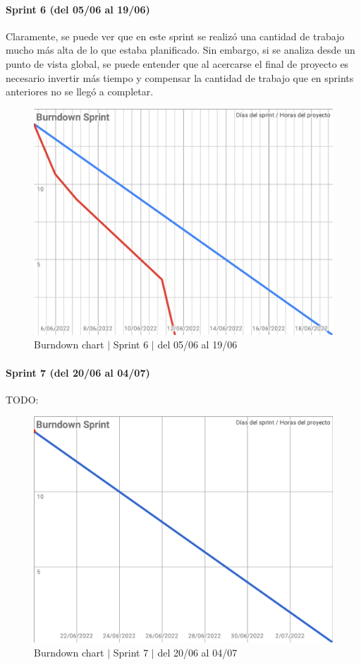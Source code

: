 \paragraph{Sprint 6 (del 05/06 al 19/06)}
Claramente, se puede ver que en este sprint se realizó una cantidad de trabajo mucho más alta de lo que estaba planificado. Sin embargo, si se analiza desde un punto de vista global, se puede entender que al acercarse el final de proyecto es necesario invertir más tiempo y compensar la cantidad de trabajo que en sprints anteriores no se llegó a completar.
\begin{figure}[H]
    \centering
    \includegraphics[width=1\linewidth]{text/image/BurndownChart6.pdf}
    \caption{Burndown chart $|$ Sprint 6 $|$ del 05/06 al 19/06}
    \label{fig:burndown_chart_6}
\end{figure}

\newpage
\paragraph{Sprint 7 (del 20/06 al 04/07)}
TODO:
\begin{figure}[H]
    \centering
    \includegraphics[width=1\linewidth]{text/image/BurndownChart7.pdf}
    \caption{Burndown chart $|$ Sprint 7 $|$ del 20/06 al 04/07}
    \label{fig:burndown_chart_7}
\end{figure}

